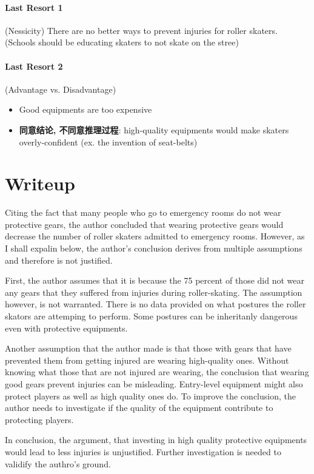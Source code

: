 \documentclass{article}
\begin{document}
    \paragraph{Last Resort 1} (Nessicity) There are no better ways to prevent
    injuries for roller skaters. (Schools should be educating skaters to not
    skate on the stree)

    \paragraph{Last Resort 2} (Advantage vs. Disadvantage)
    \begin{itemize}
      \item Good equipments are too expensive
      \item \textbf{同意结论, 不同意推理过程}: high-quality equipments would make
      skaters overly-confident (ex. the invention of seat-belts)
    \end{itemize}

  \section{Writeup}

    Citing the fact that many people who go to emergency rooms do not wear
    protective gears, the author concluded that wearing protective gears
    would decrease the number of roller skaters admitted to emergency rooms.
    However, as I shall expalin below, the author's conclusion derives from
    multiple assumptions and therefore is not justified.

    First, the author assumes that it is because the 75 percent of those did not
    wear any gears that they suffered from injuries during roller-skating.
    The assumption however, is not warranted. There is no data provided
    on what postures the roller skators are attemping to perform. Some
    postures can be inheritanly dangerous even with protective equipments.

    Another assumption that the author made is that those with gears that
    have prevented them from getting injured are wearing high-quality ones.
    Without knowing what those that are not injured are wearing, the conclusion
    that wearing good gears prevent injuries can be misleading.
    Entry-level equipment might also protect players as well as high quality
    ones do. To improve the conclusion, the author needs to investigate if
    the quality of the equipment contribute to protecting players.

    In conclusion, the argument, that investing in high quality
    protective equipments would lead to less injuries is unjustified.
    Further investigation is needed to validify the authro's ground.
\end{document}
